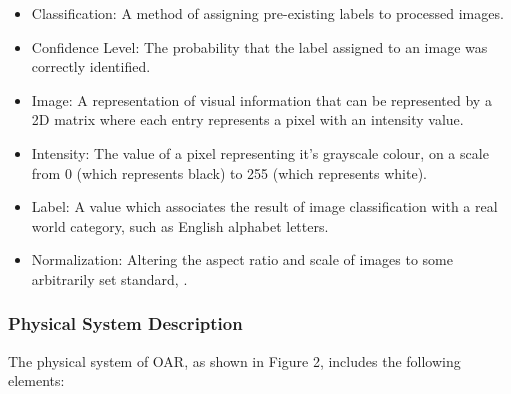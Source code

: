 \documentclass[12pt]{article}
\begin{document}
\begin{itemize}

\item Classification: A method of assigning pre-existing labels to processed images.
\item Confidence Level: The probability that the label assigned to an image was correctly identified.
\item Image: A representation of visual information that can be represented by a 2D matrix where each entry represents a pixel with an intensity value.
\item Intensity: The value of a pixel representing it's grayscale colour, on a scale from 0 (which represents black) to 255 (which represents white).
\item Label: A value which associates the result of image classification with a real world category, such as English alphabet letters.
\item Normalization: Altering the aspect ratio and scale of images to some arbitrarily set standard, \cite{Karandish2022}.


\end{itemize}

\subsubsection{Physical System Description} \label{sec_phySystDescrip}

The physical system of OAR, as shown in Figure 2,
includes the following elements:
\end{document}
